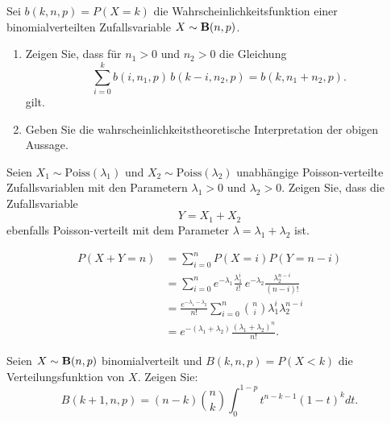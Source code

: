 \solution


Sei $b(k, n, p)=P(X=k)$ die Wahrscheinlichkeitsfunktion einer binomialverteilten
Zufallsvariable $X\sim\mathbf B(n,p)$.
\begin{enumerate}
    \item Zeigen Sie, dass für $n_1>0$ und $n_2>0$ die Gleichung
        \begin{equation*}
            \sum_{i=0}^{k} b(i, n_1, p)\, b( k-i, n_2, p) = b( k, n_1+n_2, p ).
        \end{equation*}
        gilt. 

    \item Geben Sie die wahrscheinlichkeitstheoretische Interpretation der
        obigen Aussage.
\end{enumerate}


 Seien $X_1\sim
\text{Poiss}(\lambda_1)$ und $X_2\sim \text{Poiss}(\lambda_2)$ unabhängige
Poisson-verteilte Zufallsvariablen mit den Parametern $\lambda_1>0$ und
$\lambda_2>0$. Zeigen Sie, dass die Zufallsvariable
\begin{equation*}
    Y = X_1 + X_2
\end{equation*}
ebenfalls Poisson-verteilt mit dem Parameter $\lambda=\lambda_1 + \lambda_2$ ist. 

\solution 
\begin{align*}
    P\left( X+Y=n \right) &= \sum_{i=0}^{n} P(X=i) P(Y=n-i) \\
    &= \sum_{i=0}^{n} e^{-\lambda_1} \frac{\lambda_{1}^{i}}{i!}\, e^{-\lambda_2} \frac{ \lambda_2^{n-i}}{(n-i)!} \\
    &= \frac{e^{-\lambda_1 -\lambda_2}}{n!} \sum_{i=0}^{n} \binom{n}{i} \lambda_1^{i} \lambda_2^{n-i} \\
    &= e^{- (\lambda_1 + \lambda_2)} \frac{ (\lambda_1 + \lambda_2)^{n}}{n!}.
\end{align*}


 Seien $X\sim\mathbf B(n,p)$ binomialverteilt
und $B(k, n, p) = P( X <k)$ die Verteilungsfunktion von $X$. Zeigen Sie:
\begin{equation*}
    B(k+1, n, p) = (n-k) \binom{n}{k} \int_{0}^{1-p} t^{n-k-1} (1-t)^k dt.
\end{equation*}

